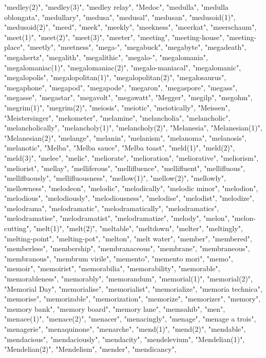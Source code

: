 "medley(2)",
"medley(3)",
"medley relay",
"Medoc",
"medulla",
"medulla oblongata",
"medullary",
"medusa",
"medusal",
"medusan",
"medusoid(1)",
"medusoid(2)",
"meed",
"meek",
"meekly",
"meekness",
"meerkat",
"meerschaum",
"meet(1)",
"meet(2)",
"meet(3)",
"meeter",
"meeting",
"meeting-house",
"meeting-place",
"meetly",
"meetness",
"mega-",
"megabuck",
"megabyte",
"megadeath",
"megahertz",
"megalith",
"megalithic",
"megalo-",
"megalomania",
"megalomaniac(1)",
"megalomaniac(2)",
"megalo-maniacal",
"megalomanic",
"megalopolis",
"megalopolitan(1)",
"megalopolitan(2)",
"megalosaurus",
"megaphone",
"megapod",
"megapode",
"megaron",
"megaspore",
"megass",
"megasse",
"megastar",
"megavolt",
"megawatt",
"Megger",
"megilp",
"megohm",
"megrim(1)",
"megrim(2)",
"meiosis",
"meiotic",
"meiotically",
"Meissen",
"Meistersinger",
"mekometer",
"melamine",
"melancholia",
"melancholic",
"melancholically",
"melancholy(1)",
"melancholy(2)",
"Melanesia",
"Melanesian(1)",
"Melanesian(2)",
"melange",
"melanin",
"melanism",
"melanoma",
"melanosis",
"melanotic",
"Melba",
"Melba sauce",
"Melba toast",
"meld(1)",
"meld(2)",
"meld(3)",
"melee",
"melic",
"meliorate",
"melioration",
"meliorative",
"meliorism",
"meliorist",
"mellay",
"melliferous",
"mellifluence",
"mellifluent",
"mellifluous",
"mellifluously",
"mellifluousness",
"mellow(1)",
"mellow(2)",
"mellowly",
"mellowness",
"melodeon",
"melodic",
"melodically",
"melodic minor",
"melodion",
"melodious",
"melodiously",
"melodiousness",
"melodise",
"melodist",
"melodize",
"melodrama",
"melodramatic",
"melodramatically",
"melodramatics",
"melodramatise",
"melodramatist",
"melodramatize",
"melody",
"melon",
"melon-cutting",
"melt(1)",
"melt(2)",
"meltable",
"meltdown",
"melter",
"meltingly",
"melting-point",
"melting-pot",
"melton",
"melt water",
"member",
"membered",
"memberless",
"membership",
"membranaceous",
"membrane",
"membraneous",
"membranous",
"membrum virile",
"memento",
"memento mori",
"memo",
"memoir",
"memoirist",
"memorabilia",
"memorability",
"memorable",
"memorableness",
"memorably",
"memorandum",
"memorial(1)",
"memorial(2)",
"Memorial Day",
"memorialise",
"memorialist",
"memorialize",
"memoria technica",
"memorise",
"memorizable",
"memorization",
"memorize",
"memorizer",
"memory",
"memory bank",
"memory board",
"memory lane",
"memsahib",
"men",
"menace(1)",
"menace(2)",
"menacer",
"menacingly",
"menage",
"menage a trois",
"menagerie",
"menaquinone",
"menarche",
"mend(1)",
"mend(2)",
"mendable",
"mendacious",
"mendaciously",
"mendacity",
"mendelevium",
"Mendelian(1)",
"Mendelian(2)",
"Mendelism",
"mender",
"mendicancy",
